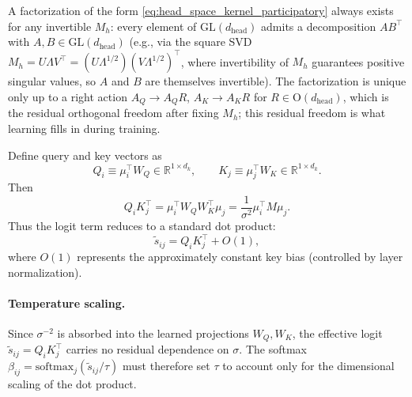 \documentclass[11pt]{article}
\begin{document}
A factorization of the form \eqref{eq:head_space_kernel_participatory} always exists for any invertible $M_h$: every element of $\mathrm{GL}(d_{\text{head}})$ admits a decomposition $A B^\top$ with $A, B \in \mathrm{GL}(d_{\text{head}})$ (e.g., via the square SVD $M_h = U\Lambda V^\top = (U\Lambda^{1/2})(V\Lambda^{1/2})^\top$, where invertibility of $M_h$ guarantees positive singular values, so $A$ and $B$ are themselves invertible). The factorization is unique only up to a right action $A_Q \to A_Q R$, $A_K \to A_K R$ for $R \in \mathrm{O}(d_{\text{head}})$, which is the residual orthogonal freedom after fixing $M_h$; this residual freedom is what learning fills in during training.

Define query and key vectors as
\begin{equation}
Q_i \equiv \mu_i^\top W_Q \in \mathbb{R}^{1\times d_k}, \qquad K_j \equiv \mu_j^\top W_K \in \mathbb{R}^{1\times d_k}.
\end{equation}
Then
\begin{equation}
Q_i K_j^\top = \mu_i^\top W_Q W_K^\top \mu_j = \frac{1}{\sigma^2}\mu_i^\top M \mu_j.
\end{equation}
Thus the logit term reduces to a standard dot product:
\begin{equation}
\tilde{s}_{ij} = Q_i K_j^\top + O(1),
\end{equation}
where $O(1)$ represents the approximately constant key bias (controlled by layer normalization).

\paragraph{Temperature scaling.}
Since $\sigma^{-2}$ is absorbed into the learned projections $W_Q, W_K$, the effective logit $\tilde{s}_{ij} = Q_i K_j^\top$ carries no residual dependence on $\sigma$. The softmax $\beta_{ij} = \mathrm{softmax}_j(\tilde{s}_{ij}/\tau)$ must therefore set $\tau$ to account only for the dimensional scaling of the dot product.
\end{document}
